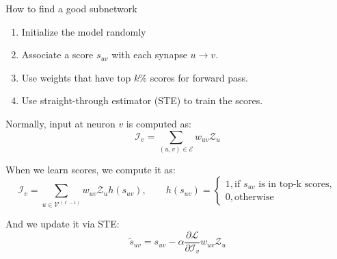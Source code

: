 \documentclass[10pt]{beamer}
\begin{document}
\begin{frame}{How to find a good subnetwork}
\begin{enumerate}
    \item\pause Initialize the model randomly
    \item\pause Associate a score $s_{uv}$ with each synapse $u \to v$.
    \item\pause Use weights that have top $k\%$ scores for forward pass.
    \item\pause Use straight-through estimator (STE) to train the scores.
\end{enumerate}

\pause
Normally, input at neuron $v$ is computed as:
\begin{equation}
\mathcal{I}_{v}=\sum_{(u, v) \in \mathcal{E}} w_{u v} \mathcal{Z}_{u}
\end{equation}

\pause
When we learn scores, we compute it as:
\begin{equation}
\mathcal{I}_{v}=\sum_{u \in \mathcal{V}^{(\ell-1)}} w_{u v} \mathcal{Z}_{u} h\left(s_{u v}\right),
\qquad
h(s_{uv}) = \begin{cases}
        1, \text{if }s_{uv}\text{ is in top-k scores}, \\
        0, \text{otherwise}
    \end{cases}
\end{equation}

\pause
And we update it via STE:
\begin{equation}
\tilde{s}_{u v}=s_{u v}-\alpha \frac{\partial \mathcal{L}}{\partial \mathcal{I}_{v}} w_{u v} \mathcal{Z}_{u}
\end{equation}

\end{frame}
\end{document}
